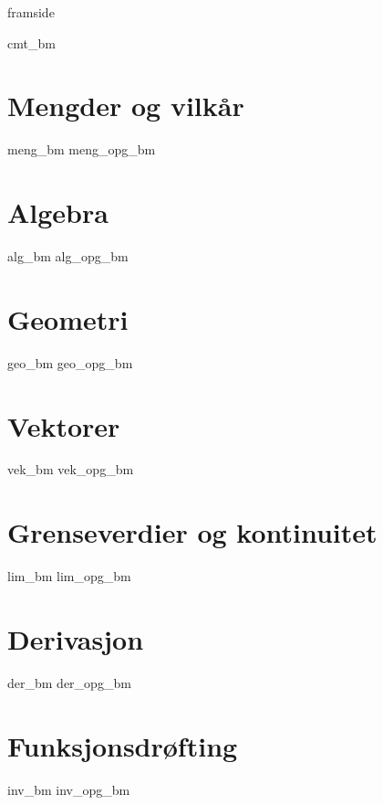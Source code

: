 



\renewcommand*\familydefault{\sfdefault} %

\addto\captionsenglish{\renewcommand{\figurename}{Figur}}
\makeatletter
\addto\captionsenglish{\renewcommand{\chaptername}{Kapittel}}
\addto\captionsenglish{\renewcommand{\contentsname}{Innhold}}


	
	{framside}
	
	{\footnotesize \tableofcontents}
	\newpage
	
	{cmt_bm}
	
	\chapter{Mengder og vilkår} \label{Meng}
	\newpage
	{meng_bm}
	{meng_opg_bm}
	
	\chapter{Algebra} \label{Alg}
	\newpage
	{alg_bm} 
	{alg_opg_bm}
	
	\chapter{Geometri} \label{Geo}
	\newpage
	{geo_bm}
	{geo_opg_bm}	
	
	\chapter{Vektorer} \label{Vek}
	\newpage
	{vek_bm}
	{vek_opg_bm}	
		
	\chapter{Grenseverdier og kontinuitet} \label{Lim}
	\newpage
	{lim_bm}	
	{lim_opg_bm}
	
	\chapter{Derivasjon} \label{Derivasjon} \label{Der}
	\newpage
	{der_bm}
	{der_opg_bm}	
	
	\chapter{Funksjonsdrøfting} \label{Funk}
	\newpage
	{inv_bm}
	{inv_opg_bm}
	
